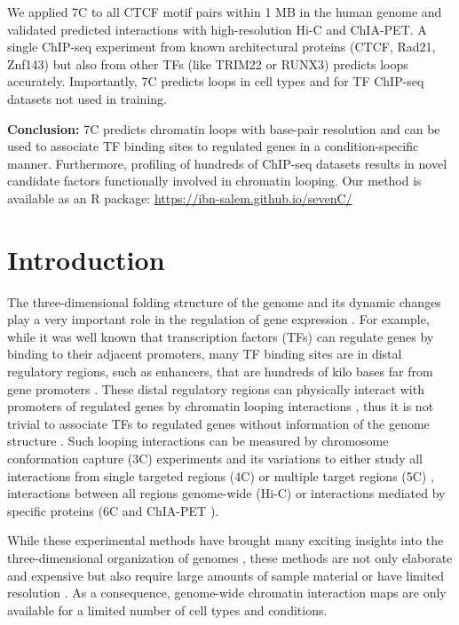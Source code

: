 \documentclass[a4paper,twoside=true,openright,parskip=full,chapterprefix=true,11pt,headings=normal,bibliography=totoc,listof=totoc,titlepage=on,captions=tableabove,draft=false]{scrreprt}
\theoremstyle{definition}
\theoremstyle{definition}
\theoremstyle{definition}
\theoremstyle{remark}
\begin{document}
We applied 7C to all CTCF motif pairs within 1 MB in the human genome
and validated predicted interactions with high-resolution Hi-C and
ChIA-PET. A single ChIP-seq experiment from known architectural proteins
(CTCF, Rad21, Znf143) but also from other TFs (like TRIM22 or RUNX3)
predicts loops accurately. Importantly, 7C predicts loops in cell types
and for TF ChIP-seq datasets not used in training.

\textbf{Conclusion:} 7C predicts chromatin loops with base-pair
resolution and can be used to associate TF binding sites to regulated
genes in a condition-specific manner. Furthermore, profiling of hundreds
of ChIP-seq datasets results in novel candidate factors functionally
involved in chromatin looping. Our method is available as an R package:
\url{https://ibn-salem.github.io/sevenC/}

\hypertarget{introduction-3}{%
\section{Introduction}\label{introduction-3}}

The three-dimensional folding structure of the genome and its dynamic
changes play a very important role in the regulation of gene expression
\citep{Merkenschlager2016, Krijger2016}. For example, while it was well
known that transcription factors (TFs) can regulate genes by binding to
their adjacent promoters, many TF binding sites are in distal regulatory
regions, such as enhancers, that are hundreds of kilo bases far from
gene promoters \citep{Spitz2012}. These distal regulatory regions can
physically interact with promoters of regulated genes by chromatin
looping interactions \citep{Tolhuis2002, Sanyal2012}, thus it is not
trivial to associate TFs to regulated genes without information of the
genome structure \citep{Mora2015}. Such looping interactions can be
measured by chromosome conformation capture (3C) experiments
\citep{Dekker2002} and its variations to either study all interactions
from single targeted regions (4C) \citep{Simonis2006} or multiple target
regions (5C) \citep{Dostie2006}, interactions between all regions
genome-wide (Hi-C) \citep{Lieberman-Aiden2009, Rao2014} or interactions
mediated by specific proteins (6C \citep{Tiwari2008} and ChIA-PET
\citep{Fullwood2009, Tang2015}).

While these experimental methods have brought many exciting insights
into the three-dimensional organization of genomes
\citep{Merkenschlager2016, Krijger2016, Bonev2016}, these methods are
not only elaborate and expensive but also require large amounts of
sample material or have limited resolution
\citep{Sati2016, Schmitt2016}. As a consequence, genome-wide chromatin
interaction maps are only available for a limited number of cell types
and conditions.
\end{document}
